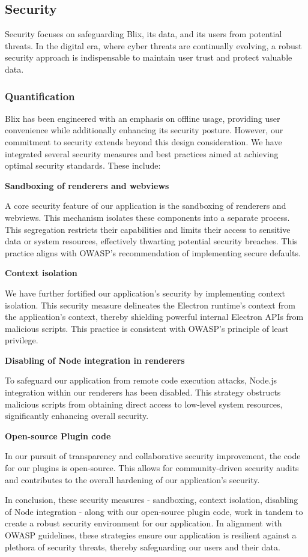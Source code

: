 \documentclass[11pt,a4paper]{article}
\begin{document}
\subsection*{Security}

Security focuses on safeguarding Blix, its data, and its users from potential
threats. In the digital era, where cyber threats are continually evolving, a
robust security approach is indispensable to maintain user trust and protect
valuable data.

\subsubsection*{Quantification}

Blix has been engineered with an emphasis on offline usage, providing user
convenience while additionally enhancing its security posture. However, our
commitment to security extends beyond this design consideration. We have
integrated several security measures and best practices aimed at achieving
optimal security standards. These include:

\textbf{Sandboxing of renderers and webviews}

A core security feature of our application is the sandboxing of renderers and
webviews. This mechanism isolates these components into a separate process. This
segregation restricts their capabilities and limits their access to sensitive
data or system resources, effectively thwarting potential security breaches.
This practice aligns with OWASP's recommendation of implementing secure
defaults.

\textbf{Context isolation}

We have further fortified our application's security by implementing context
isolation. This security measure delineates the Electron runtime's context from
the application's context, thereby shielding powerful internal Electron APIs
from malicious scripts. This practice is consistent with OWASP's principle of
least privilege.

\textbf{Disabling of Node integration in renderers}

To safeguard our application from remote code execution attacks, Node.js
integration within our renderers has been disabled. This strategy obstructs
malicious scripts from obtaining direct access to low-level system resources,
significantly enhancing overall security.

\textbf{Open-source Plugin code}

In our pursuit of transparency and collaborative security improvement, the code
for our plugins is open-source. This allows for community-driven security audits
and contributes to the overall hardening of our application's security.

In conclusion, these security measures - sandboxing, context isolation,
disabling of Node integration - along with our open-source plugin code, work in
tandem to create a robust security environment for our application. In alignment
with OWASP guidelines, these strategies ensure our application is resilient
against a plethora of security threats, thereby safeguarding our users and their
data.
\end{document}
